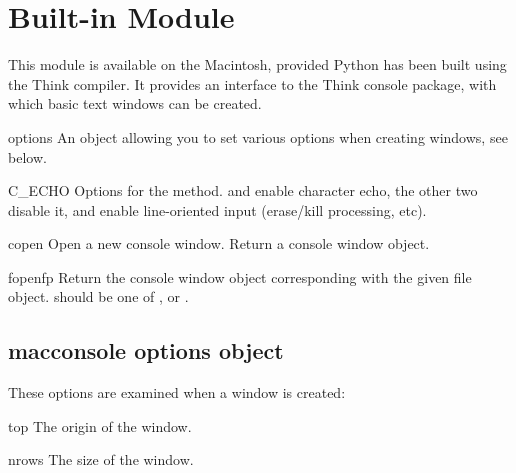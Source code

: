 \section{Built-in Module }




This module is available on the Macintosh, provided Python has been
built using the Think \C{} compiler. It provides an interface to the
Think console package, with which basic text windows can be created.

\begin{datadesc}{options}
An object allowing you to set various options when creating windows,
see below.
\end{datadesc}

\begin{datadesc}{C_ECHO}
Options for the  method.  and
 enable character echo, the other two disable it,
 and  enable line-oriented input
(erase/kill processing, etc).
\end{datadesc}

\begin{funcdesc}{copen}{}
Open a new console window. Return a console window object.
\end{funcdesc}

\begin{funcdesc}{fopen}{fp}
Return the console window object corresponding with the given file
object.  should be one of ,  or
.
\end{funcdesc}

\subsection{macconsole options object}
These options are examined when a window is created:

\begin{datadesc}{top}
The origin of the window.
\end{datadesc}

\begin{datadesc}{nrows}
The size of the window.
\end{datadesc}

